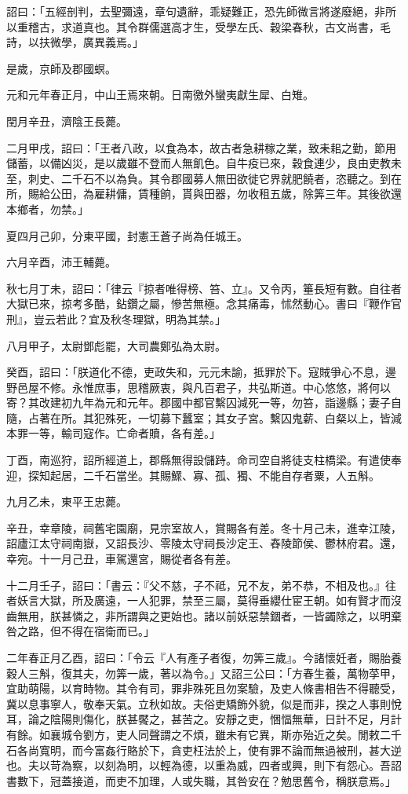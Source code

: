 \begin{pinyinscope}
詔曰：「五經剖判，去聖彌遠，章句遺辭，乖疑難正，恐先師微言將遂廢絕，非所以重稽古，求道真也。其令群儒選高才生，受學左氏、穀梁春秋，古文尚書，毛詩，以扶微學，廣異義焉。」

是歲，京師及郡國螟。

元和元年春正月，中山王焉來朝。日南徼外蠻夷獻生犀、白雉。

閏月辛丑，濟陰王長薨。

二月甲戌，詔曰：「王者八政，以食為本，故古者急耕稼之業，致耒耜之勤，節用儲蓄，以備凶災，是以歲雖不登而人無飢色。自牛疫已來，穀食連少，良由吏教未至，刺史、二千石不以為負。其令郡國募人無田欲徙它界就肥饒者，恣聽之。到在所，賜給公田，為雇耕傭，賃種餉，貰與田器，勿收租五歲，除筭三年。其後欲還本鄉者，勿禁。」

夏四月己卯，分東平國，封憲王蒼子尚為任城王。

六月辛酉，沛王輔薨。

秋七月丁未，詔曰：「律云『掠者唯得榜、笞、立』。又令丙，箠長短有數。自往者大獄已來，掠考多酷，鉆鑽之屬，慘苦無極。念其痛毒，怵然動心。書曰『鞭作官刑』，豈云若此？宜及秋冬理獄，明為其禁。」

八月甲子，太尉鄧彪罷，大司農鄭弘為太尉。

癸酉，詔曰：「朕道化不德，吏政失和，元元未諭，抵罪於下。寇賊爭心不息，邊野邑屋不修。永惟庶事，思稽厥衷，與凡百君子，共弘斯道。中心悠悠，將何以寄？其改建初九年為元和元年。郡國中都官繫囚減死一等，勿笞，詣邊縣；妻子自隨，占著在所。其犯殊死，一切募下蠶室；其女子宮。繫囚鬼薪、白粲以上，皆減本罪一等，輸司寇作。亡命者贖，各有差。」

丁酉，南巡狩，詔所經道上，郡縣無得設儲跱。命司空自將徒支柱橋梁。有遣使奉迎，探知起居，二千石當坐。其賜鰥、寡、孤、獨、不能自存者粟，人五斛。

九月乙未，東平王忠薨。

辛丑，幸章陵，祠舊宅園廟，見宗室故人，賞賜各有差。冬十月己未，進幸江陵，詔廬江太守祠南嶽，又詔長沙、零陵太守祠長沙定王、舂陵節侯、鬱林府君。還，幸宛。十一月己丑，車駕還宮，賜從者各有差。

十二月壬子，詔曰：「書云：『父不慈，子不祗，兄不友，弟不恭，不相及也。』往者妖言大獄，所及廣遠，一人犯罪，禁至三屬，莫得垂纓仕宦王朝。如有賢才而沒齒無用，朕甚憐之，非所謂與之更始也。諸以前妖惡禁錮者，一皆蠲除之，以明棄咎之路，但不得在宿衛而已。」

二年春正月乙酉，詔曰：「令云『人有產子者復，勿筭三歲』。今諸懷妊者，賜胎養穀人三斛，復其夫，勿筭一歲，著以為令。」又詔三公曰：「方春生養，萬物莩甲，宜助萌陽，以育時物。其令有司，罪非殊死且勿案驗，及吏人條書相告不得聽受，冀以息事寧人，敬奉天氣。立秋如故。夫俗吏矯飾外貌，似是而非，揆之人事則悅耳，論之陰陽則傷化，朕甚饜之，甚苦之。安靜之吏，悃愊無華，日計不足，月計有餘。如襄城令劉方，吏人同聲謂之不煩，雖未有它異，斯亦殆近之矣。閒敕二千石各尚寬明，而今富姦行賂於下，貪吏枉法於上，使有罪不論而無過被刑，甚大逆也。夫以苛為察，以刻為明，以輕為德，以重為威，四者或興，則下有怨心。吾詔書數下，冠蓋接道，而吏不加理，人或失職，其咎安在？勉思舊令，稱朕意焉。」


\end{pinyinscope}
